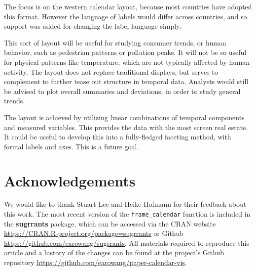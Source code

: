 \documentclass[12pt]{article}
\begin{document}
The focus is on the western calendar layout, because most countries have
adopted this format. However the language of labels would differ across
countries, and so support was added for changing the label language
simply.

This sort of layout will be useful for studying consumer trends, or
human behavior, such as pedestrian patterns or pollution peaks. It will
not be so useful for physical patterns like temperature, which are not
typically affected by human activity. The layout does not replace
traditional displays, but serves to complement to further tease out
structure in temporal data. Analysts would still be advised to plot
overall summaries and deviations, in order to study general trends.

The layout is achieved by utilizing linear combinations of temporal
components and measured variables. This provides the data with the most
screen real estate. It could be useful to develop this into a
fully-fledged faceting method, with formal labels and axes. This is a
future goal.

\hypertarget{acknowledgements}{%
\section*{Acknowledgements}\label{acknowledgements}}

We would like to thank Stuart Lee and Heike Hofmann for their feedback
about this work. The most recent version of the \texttt{frame\_calendar}
function is included in the \textbf{sugrrants} package, which can be
accessed via the CRAN website
\url{https://CRAN.R-project.org/package=sugrrants} or Github
\url{https://github.com/earowang/sugrrants}. All materials required to
reproduce this article and a history of the changes can be found at the
project's Github repository
\url{https://github.com/earowang/paper-calendar-vis}.



\end{document}
